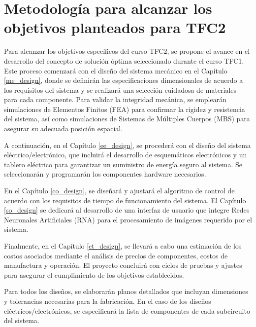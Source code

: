 \section{Metodología para alcanzar los objetivos planteados para TFC2}

Para alcanzar los objetivos específicos del curso TFC2, se propone el avance en el desarrollo del concepto de solución óptima seleccionado durante el curso TFC1. Este proceso comenzará con el diseño del sistema mecánico en el Capítulo \ref{me_design}, donde se definirán las especificaciones dimensionales de acuerdo a los requisitos del sistema y se realizará una selección cuidadosa de materiales para cada componente. Para validar la integridad mecánica, se emplearán simulaciones de Elementos Finitos (FEA) para confirmar la rigidez y resistencia del sistema, así como simulaciones de Sistemas de Múltiples Cuerpos (MBS) para asegurar su adecuada posición espacial.

A continuación, en el Capítulo \ref{ee_design}, se procederá con el diseño del sistema eléctrico/electrónico, que incluirá el desarrollo de esquemáticos electrónicos y un tablero eléctrico para garantizar un suministro de energía seguro al sistema. Se seleccionarán y programarán los componentes hardware necesarios.

En el Capítulo \ref{co_design}, se diseñará y ajustará el algoritmo de control de acuerdo con los requisitos de tiempo de funcionamiento del sistema. El Capítulo \ref{so_design} se dedicará al desarrollo de una interfaz de usuario que integre Redes Neuronales Artificiales (RNA) para el procesamiento de imágenes requerido por el sistema.

Finalmente, en el Capítulo \ref{ct_design}, se llevará a cabo una estimación de los costos asociados mediante el análisis de precios de componentes, costos de manufactura y operación. El proyecto concluirá con ciclos de pruebas y ajustes para asegurar el cumplimiento de los objetivos establecidos.

Para todos los diseños, se elaborarán planos detallados que incluyan dimensiones y tolerancias necesarias para la fabricación. En el caso de los diseños eléctricos/electrónicos, se especificará la lista de componentes de cada subcircuito del sistema.
